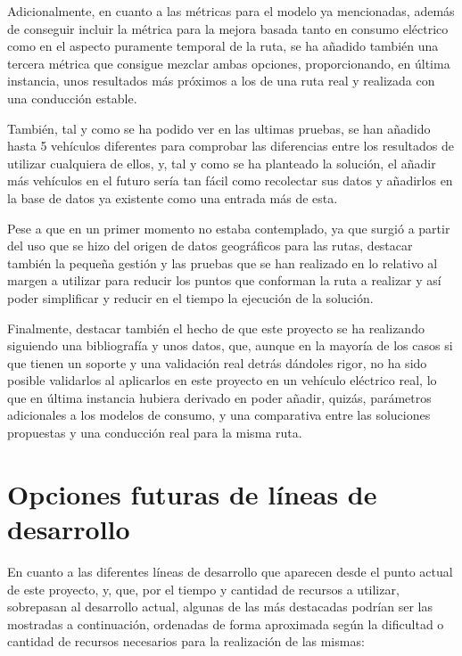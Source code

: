 \documentclass[11pt,spanish,listoffigures,listoftables]{tfgetsinf}
\begin{document}
Adicionalmente, en cuanto a las métricas para el modelo ya mencionadas, además de conseguir incluir la métrica para la mejora basada tanto en consumo eléctrico como en el aspecto puramente temporal de la ruta, se ha añadido también una tercera métrica que consigue mezclar ambas opciones, proporcionando, en última instancia, unos resultados más próximos a los de una ruta real y realizada con una conducción estable.

También, tal y como se ha podido ver en las ultimas pruebas, se han añadido hasta 5 vehículos diferentes para comprobar las diferencias entre los resultados de utilizar cualquiera de ellos, y, tal y como se ha planteado la solución, el añadir más vehículos en el futuro sería tan fácil como recolectar sus datos y añadirlos en la base de datos ya existente como una entrada más de esta.

Pese a que en un primer momento no estaba contemplado, ya que surgió a partir del uso que se hizo del origen de datos geográficos para las rutas, destacar también la pequeña gestión y las pruebas que se han realizado en lo relativo al margen a utilizar para reducir los puntos que conforman la ruta a realizar y así poder simplificar y reducir en el tiempo la ejecución de la solución.

Finalmente, destacar también el hecho de que este proyecto se ha realizando siguiendo una bibliografía y unos datos, que, aunque en la mayoría de los casos si que tienen un soporte y una validación real detrás dándoles rigor, no ha sido posible validarlos al aplicarlos en este proyecto en un vehículo eléctrico real, lo que en última instancia hubiera derivado en poder añadir, quizás, parámetros adicionales a los modelos de consumo, y una comparativa entre las soluciones propuestas y una conducción real para la misma ruta.

\section{Opciones futuras de líneas de desarrollo}
En cuanto a las diferentes líneas de desarrollo que aparecen desde el punto actual de este proyecto, y, que, por el tiempo y cantidad de recursos a utilizar, sobrepasan al desarrollo actual, algunas de las más destacadas podrían ser las mostradas a continuación, ordenadas de forma aproximada según la dificultad o cantidad de recursos necesarios para la realización de las mismas:
\end{document}
